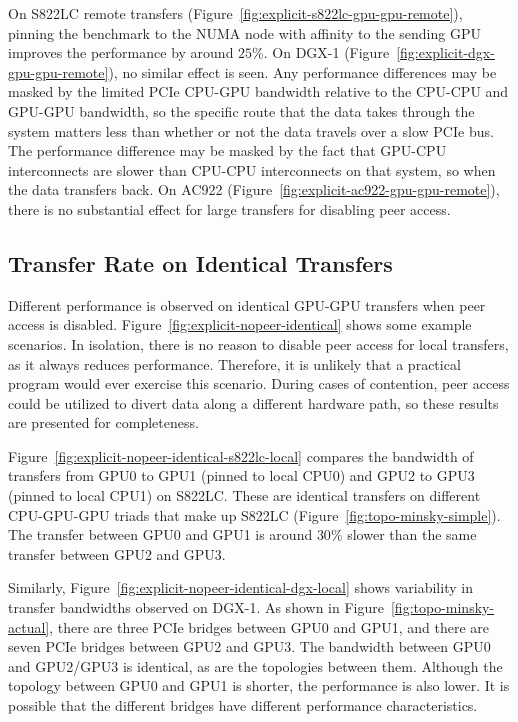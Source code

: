 On S822LC remote transfers (Figure~\ref{fig:explicit-s822lc-gpu-gpu-remote}), pinning the benchmark to the NUMA node with affinity to the sending GPU improves the performance by around $25$\%.
On DGX-1 (Figure~\ref{fig:explicit-dgx-gpu-gpu-remote}), no similar effect is seen.
Any performance differences may be masked by the limited PCIe CPU-GPU bandwidth relative to the CPU-CPU and GPU-GPU bandwidth, so the specific route that the data takes through the system matters less than whether or not the data travels over a slow PCIe bus.
The performance difference may be masked by the fact that GPU-CPU interconnects are slower than CPU-CPU interconnects on that system, so when the data transfers back.
On AC922 (Figure~\ref{fig:explicit-ac922-gpu-gpu-remote}), there is no substantial effect for large transfers for disabling peer access.

\subsection{Transfer Rate on Identical Transfers}
\label{sec:explicit-peer-identical}

Different performance is observed on identical GPU-GPU transfers when peer access is disabled.
Figure~\ref{fig:explicit-nopeer-identical} shows some example scenarios.
In isolation, there is no reason to disable peer access for local transfers, as it always reduces performance.
Therefore, it is unlikely that a practical program would ever exercise this scenario.
During cases of contention, peer access could be utilized to divert data along a different hardware path, so these results are presented for completeness.

Figure~\ref{fig:explicit-nopeer-identical-s822lc-local} compares the bandwidth of transfers from GPU0 to GPU1 (pinned to local CPU0) and GPU2 to GPU3 (pinned to local CPU1) on S822LC.
These are identical transfers on different CPU-GPU-GPU triads that make up S822LC (Figure~\ref{fig:topo-minsky-simple}).
The transfer between GPU0 and GPU1 is around $30$\% slower than the same transfer between GPU2 and GPU3.

Similarly, Figure~\ref{fig:explicit-nopeer-identical-dgx-local} shows variability in transfer bandwidths observed on DGX-1.
As shown in Figure~\ref{fig:topo-minsky-actual}, there are three PCIe bridges between GPU0 and GPU1, and there are seven PCIe bridges between GPU2 and GPU3.
The bandwidth between GPU0 and GPU2/GPU3 is identical, as are the topologies between them.
Although the topology between GPU0 and GPU1 is shorter, the performance is also lower.
It is possible that the different bridges have different performance characteristics.

